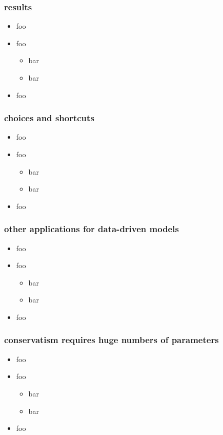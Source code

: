 \documentclass[pdftex]{beamer}
\begin{document}
\begin{frame}
  \frametitle{results}
  \begin{itemize}
  \item foo
  \item foo
    \begin{itemize}
    \item bar
    \item bar
    \end{itemize}
  \item foo
  \end{itemize}
\end{frame}

\begin{frame}
  \frametitle{choices and shortcuts}
  \begin{itemize}
  \item foo
  \item foo
    \begin{itemize}
    \item bar
    \item bar
    \end{itemize}
  \item foo
  \end{itemize}
\end{frame}

\begin{frame}
  \frametitle{other applications for data-driven models}
  \begin{itemize}
  \item foo
  \item foo
    \begin{itemize}
    \item bar
    \item bar
    \end{itemize}
  \item foo
  \end{itemize}
\end{frame}

\begin{frame}
  \frametitle{conservatism requires huge numbers of parameters}
  \begin{itemize}
  \item foo
  \item foo
    \begin{itemize}
    \item bar
    \item bar
    \end{itemize}
  \item foo
  \end{itemize}
\end{frame}
\end{document}
